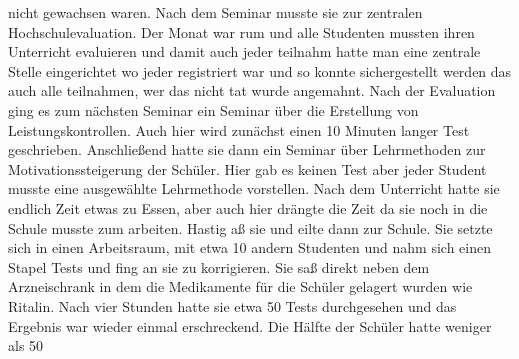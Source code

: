 \documentclass[12pt,a4paper]{article}
\begin{document}
\begin{appendix}
nicht gewachsen waren. Nach dem Seminar musste sie zur zentralen Hochschulevaluation. Der Monat war rum und alle Studenten mussten ihren Unterricht evaluieren und damit auch jeder teilnahm hatte man eine zentrale Stelle eingerichtet wo jeder registriert war und so konnte sichergestellt werden das auch alle teilnahmen, wer das nicht tat wurde angemahnt.  Nach der Evaluation ging es zum nächsten Seminar ein Seminar über die Erstellung von Leistungskontrollen. Auch hier wird zunächst einen 10 Minuten langer Test geschrieben. Anschließend hatte sie dann ein Seminar über Lehrmethoden zur Motivationssteigerung der Schüler.  Hier gab es keinen Test aber jeder Student musste eine ausgewählte Lehrmethode vorstellen. Nach dem Unterricht hatte sie endlich Zeit etwas zu Essen, aber auch hier drängte die Zeit da sie noch in die Schule musste zum arbeiten.  Hastig aß sie und eilte dann zur Schule. Sie setzte sich in einen Arbeitsraum,  mit etwa 10 andern Studenten und nahm sich einen Stapel Tests und fing an sie zu korrigieren. Sie saß direkt neben dem Arzneischrank in dem die Medikamente für die Schüler gelagert wurden  wie Ritalin. Nach vier Stunden hatte sie etwa 50 Tests durchgesehen und das Ergebnis war wieder einmal erschreckend. Die Hälfte der Schüler hatte weniger als 50%
\end{appendix}
\end{document}
